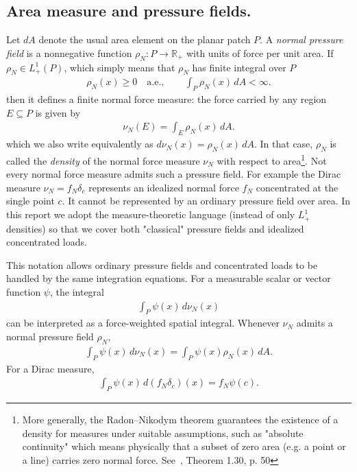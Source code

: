 \documentclass[11pt,a4paper]{article}
\theoremstyle{plain}
\begin{document}
\subsection{Area measure and pressure fields.}
Let $dA$ denote the usual area element on the planar patch $P$.
A \textit{normal pressure field} is a nonnegative function $\rho_N:P\rightarrow\mathbb R_+$ with units of force per unit area. If $\rho_N\in L^1_+(P)$, which simply means that $\rho_N$ has finite integral over $P$
\begin{align}
\rho_N(x)\ge 0\quad\text{a.e.},
\qquad
\int_P \rho_N(x)\,dA<\infty.
\end{align}
then it defines a finite normal force measure: the force carried by any region $E\subseteq P$ is given by
\begin{align}
\nu_N(E) = \int_E \rho_N(x)\,dA.
\end{align}
which we also write equivalently as $d\nu_N(x)=\rho_N(x)\,dA$. In that case, $\rho_N$ is called the \textit{density} of the normal force measure $\nu_N$ with respect to area\footnote{More generally, the Radon--Nikodym theorem guarantees the existence of a density for measures under suitable assumptions, such as "absolute continuity" which means physically that a subset of zero area (e.g. a point or a line) carries zero normal force. See~\cite{evans2015measure}, Theorem 1.30, p. 50}. Not every normal force measure admits such a pressure field. For example the Dirac measure $\nu_N=f_N\delta_c$ represents an idealized normal force $f_N$ concentrated at the single point $c$. It cannot be represented by an ordinary pressure field over area. In this report we adopt the measure-theoretic language (instead of only $L_+^1$ densities) so that we cover both "classical" pressure fields and idealized concentrated loads.

This notation allows ordinary pressure fields and concentrated loads to be handled by the same integration equations. For a measurable scalar or vector function $\psi$, the integral 
\begin{align}
\int_P \psi(x)\,d\nu_N(x)
\end{align}
can be interpreted as a force-weighted spatial integral. 
Whenever $\nu_N$ admits a normal pressure field $\rho_N$,
\begin{align}
\int_P \psi(x)\,d\nu_N(x) = \int_P \psi(x)\rho_N(x)\,dA.
\end{align} 
For a Dirac measure,
\begin{align}
\int_P \psi(x)\,d(f_N\delta_c)(x) = f_N\psi(c).
\end{align}
\end{document}
